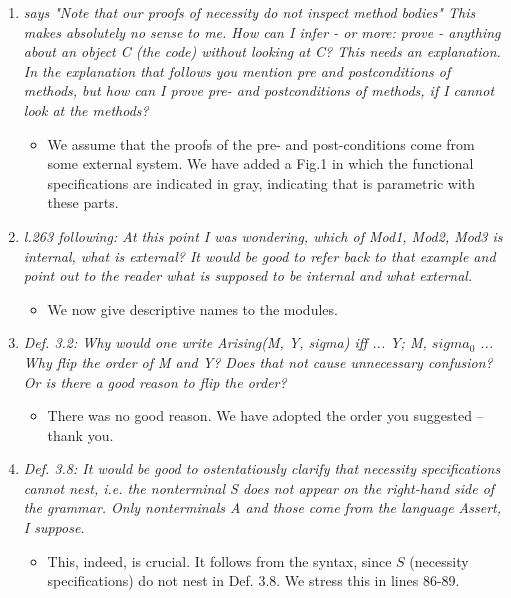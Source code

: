 \documentclass[11pt]{amsart}
\begin{document}
\begin{enumerate}
 

\item
\emph{
says "Note that our proofs of necessity do not inspect method bodies" This makes absolutely no sense to me. How can I infer - or more: prove - anything about an object C (the code) without looking at C? This needs an explanation. In the explanation that follows you mention pre and postconditions of methods, but how can I prove pre- and postconditions of methods, if I cannot look at the methods?
}

\begin{itemize}
\item We assume that the proofs of the pre- and post-conditions come from some external system. We have added a Fig.1 in which the functional specifications are indicated in gray, indicating that \Nec  is parametric with these parts.
\end{itemize}

\item
\emph{
l.263 following: At this point I was wondering, which of Mod1, Mod2, Mod3 is internal, what is external? It would be good to refer back to that example and point out to the reader what is supposed to be internal and what external.
}
\begin{itemize}
\item We now give descriptive names to the modules.
\end{itemize}

\item
\emph{
Def. 3.2: Why would one write Arising(M, Y, sigma) iff ... Y; M, $sigma_0$ ... Why flip the order of M and Y? Does that not cause unnecessary confusion? Or is there a good reason to flip the order?
}
\begin{itemize}
\item There was no good reason. We have adopted the order you suggested -- thank you.
\end{itemize}
\item
\emph{
Def. 3.8: It would be good to ostentatiously clarify that necessity specifications cannot nest, i.e. the nonterminal S does not appear on the right-hand side of the grammar. Only nonterminals A and those come from the language Assert, I suppose.
}

\begin{itemize}
\item This, indeed, is crucial. It follows from the syntax, since $S$ (necessity specifications) do not nest in Def. 3.8. We stress this in lines 86-89.
\end{itemize}


\end{enumerate}
\end{document}
